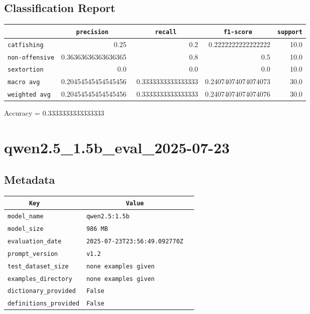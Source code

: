 \documentclass{article}
\begin{document}
\subsection{Classification Report}

\begin{center}
\begin{tabular}{l | r | r | r | r} \hline
    \verb|            | & \verb|    precision     | & \verb|      recall      | & \verb|     f1-score     | & \verb|support| \\ \hline
    \hline
    \verb|catfishing | & 0.25 & 0.2 & 0.2222222222222222 &    10.0 \\ \hline
    \verb|non-offensive| & 0.36363636363636365 & 0.8 & 0.5 &    10.0 \\ \hline
    \verb|sextortion | & 0.0 & 0.0 & 0.0 &    10.0 \\ \hline
    \verb|macro avg  | & 0.20454545454545456 & 0.3333333333333333 & 0.24074074074074073 &    30.0 \\ \hline
    \verb|weighted avg| & 0.20454545454545456 & 0.3333333333333333 & 0.24074074074074076 &    30.0 \\ \hline
\end{tabular}
\end{center}

\begin{center}
Accuracy = 0.3333333333333333
\end{center}

\section{qwen2.5\_1.5b\_eval\_2025-07-23}
\subsection{Metadata}

\begin{center}
\begin{tabular}{l | l} \hline
    \verb|      Key      | & \verb|           Value           | \\ \hline
    \hline
    \verb|model_name    | & \verb|qwen2.5:1.5b                 | \\ \hline
    \verb|model_size    | & \verb|986 MB                       | \\ \hline
    \verb|evaluation_date| & \verb|2025-07-23T23:56:49.092770Z  | \\ \hline
    \verb|prompt_version| & \verb|v1.2                         | \\ \hline
    \verb|test_dataset_size| & \verb|none examples given          | \\ \hline
    \verb|examples_directory| & \verb|none examples given          | \\ \hline
    \verb|dictionary_provided| & \verb|False                        | \\ \hline
    \verb|definitions_provided| & \verb|False                        | \\ \hline
\end{tabular}
\end{center}
\end{document}
